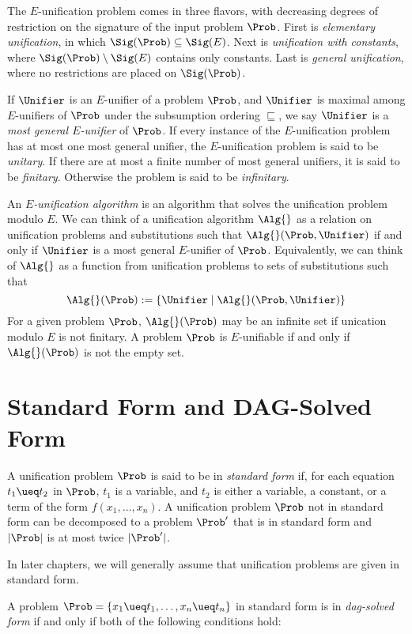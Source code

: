 The $E$-unification problem comes in three flavors, with decreasing degrees of
restriction on the signature of the input problem $\Prob$. First is
\emph{elementary unification}, in which $\Sig(\Prob) \subseteq \Sig(E)$. Next
is \emph{unification with constants}, where $\Sig(\Prob) \setminus \Sig(E)$
contains only constants. Last is \emph{general unification}, where no
restrictions are placed on $\Sig(\Prob)$.

If $\Unifier$ is an $E$-unifier of a problem $\Prob$, and $\Unifier$ is maximal
among $E$-unifiers of $\Prob$ under the subsumption ordering $\sqsubseteq$, we
say $\Unifier$ is a \emph{most general $E$-unifier} of $\Prob$. If every instance
of the $E$-unification problem has at most one most general unifier, the
$E$-unification problem is said to be \emph{unitary}. If there are at most a
finite number of most general unifiers, it is said to be \emph{finitary}.
Otherwise the problem is said to be \emph{infinitary}.

An \emph{$E$-unification algorithm} is an algorithm that solves the unification
problem modulo $E$. We can think of a unification algorithm $\Alg{}$ as a
relation on unification problems and substitutions such that $\Alg{}(\Prob,
\Unifier)$ if and only if $\Unifier$ is a most general $E$-unifier of $\Prob$.
Equivalently, we can think of $\Alg{}$ as a function from unification problems
to sets of substitutions such that
\[ \Alg{}(\Prob) := \{ \Unifier \mid \Alg{}(\Prob, \Unifier) \} \]
For a given problem $\Prob$, $\Alg{}(\Prob)$ may be an infinite set if
unication modulo $E$ is not finitary. A problem $\Prob$ is $E$-unifiable if and
only if $\Alg{}(\Prob)$ is not the empty set.

\section{Standard Form and DAG-Solved Form}\label{sec:std-form}

A unification problem $\Prob$ is said to be in \emph{standard form} if, for
each equation $t_1 \ueq t_2$ in $\Prob$, $t_1$ is a variable, and $t_2$ is
either a variable, a constant, or a term of the form $f(x_1, \dotsc, x_n)$. A
unification problem $\Prob$ not in standard form can be decomposed to a problem
$\Prob'$ that is in standard form and $|\Prob|$ is at most twice $|\Prob'|$.

In later chapters, we will generally assume that unification problems are given
in standard form.

A problem $\Prob = \{ x_1 \ueq t_1, \dotsc, x_n \ueq t_n \}$ in standard form
is in \emph{dag-solved form} if and only if both of the following conditions
hold:

